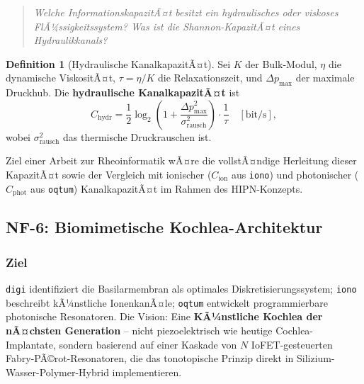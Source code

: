 ﻿\documentclass[a4paper,12pt]{scrreprt}
\theoremstyle{definition}
\newtheorem{definition}{Definition}[section]
\begin{document}
\begin{quote}
  \itshape
  Welche InformationskapazitÃ¤t besitzt ein hydraulisches oder
  viskoses FlÃ¼ssigkeitssystem? Was ist die \emph{Shannon-KapazitÃ¤t
  eines Hydraulikkanals}?
\end{quote}

\begin{definition}[Hydraulische KanalkapazitÃ¤t]
  Sei $K$ der Bulk-Modul, $\eta$ die dynamische ViskositÃ¤t, $\tau = \eta/K$
  die Relaxationszeit, und $\Delta p_{\max}$ der maximale Druckhub. Die
  \textbf{hydraulische KanalkapazitÃ¤t} ist
  \[
    C_{\text{hydr}} = \frac{1}{2} \log_2\!\left(1 +
      \frac{\Delta p_{\max}^2}{\sigma_{\mathrm{rausch}}^2}\right)
      \cdot \frac{1}{\tau} \quad [\text{bit/s}],
  \]
  wobei $\sigma_{\mathrm{rausch}}^2$ das thermische Druckrauschen ist.
\end{definition}

Ziel einer Arbeit zur Rheoinformatik wÃ¤re die vollstÃ¤ndige Herleitung
dieser KapazitÃ¤t sowie der Vergleich mit ionischer ($C_{\text{ion}}$ aus
\texttt{iono}) und photonischer ($C_{\text{phot}}$ aus \texttt{oqtum})
KanalkapazitÃ¤t im Rahmen des HIPN-Konzepts.

\subsection{NF-6: Biomimetische Kochlea-Architektur}

\subsubsection{Ziel}

\texttt{digi} identifiziert die Basilarmembran als optimales
Diskretisierungssystem; \texttt{iono} beschreibt kÃ¼nstliche IonenkanÃ¤le;
\texttt{oqtum} entwickelt programmierbare photonische Resonatoren.
Die Vision: Eine \textbf{KÃ¼nstliche Kochlea der nÃ¤chsten Generation} --
nicht piezoelektrisch wie heutige Cochlea-Implantate, sondern basierend
auf einer Kaskade von $N$ IoFET-gesteuerten Fabry-PÃ©rot-Resonatoren,
die das tonotopische Prinzip direkt in Silizium-Wasser-Polymer-Hybrid
implementieren.
\end{document}
